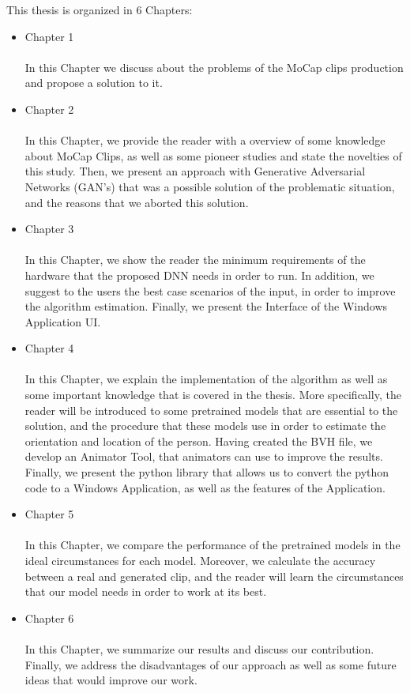 This thesis is organized in 6 Chapters:

	\begin{itemize}
		\item Chapter 1\\\\
            In this Chapter we discuss about the problems of the MoCap clips production and propose a solution to it. 
		\item Chapter 2\\\\
            In this Chapter, we provide the reader with a overview of some knowledge about MoCap Clips, as well as some pioneer studies and state the novelties of this study. Then, we present an approach with Generative Adversarial Networks (GAN's) that was a possible solution of the problematic situation, and the reasons that we aborted this solution.
		\item Chapter 3\\\\
		    In this Chapter, we show the reader the minimum requirements of the hardware that the proposed DNN needs in order to run. In addition, we suggest to the users the best case scenarios of the input, in order to improve the algorithm estimation. Finally, we present the Interface of the Windows Application UI.  
		\item Chapter 4\\\\
            In this Chapter, we explain the implementation of the algorithm as well as some important knowledge that is covered in the thesis. More specifically, the reader will be introduced to some pretrained models that are essential to the solution, and the procedure that these models use in order to estimate the orientation and location of the person. Having created the BVH file, we develop an Animator Tool, that animators can use to improve the results. Finally, we present the python library that allows us to convert the python code to a Windows Application, as well as the features of the Application. 
		\item Chapter 5\\\\
            In this Chapter, we compare the performance of the pretrained models in the ideal circumstances for each model. Moreover, we calculate the accuracy between a real and generated clip, and the reader will learn the circumstances that our model needs in order to work at its best.
		\item Chapter 6\\\\
            In this Chapter, we summarize our results and discuss our contribution. Finally, we address the disadvantages of our approach as well as some future ideas that would improve our work. 

	\end{itemize}